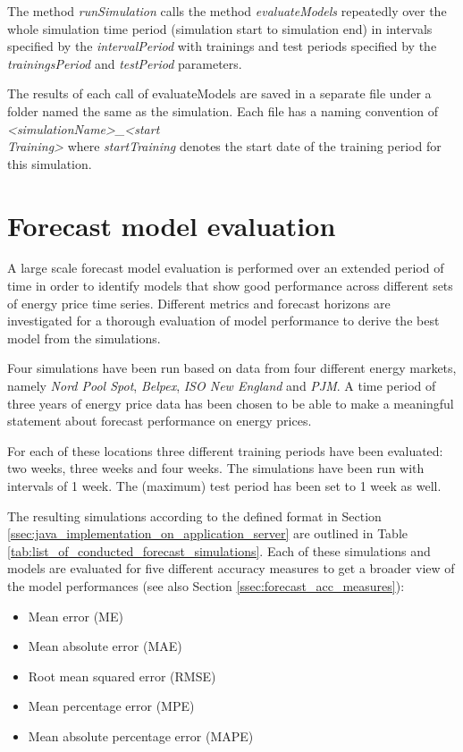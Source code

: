The method \textit{runSimulation} calls the method \textit{evaluateModels} repeatedly over the whole simulation time period (simulation start to simulation end) in intervals specified by the \textit{intervalPeriod} with trainings and test periods specified by the \textit{trainingsPeriod} and \textit{testPeriod} parameters. 

The results of each call of evaluateModels are saved in a separate file under a folder named the same as the simulation. Each file has a naming convention of \textit{<simulationName>\_<start\\Training>} where \textit{startTraining} denotes the start date of the training period for this simulation. 



\section{Forecast model evaluation} \label{sec:forecast_model_evaluation}

A large scale forecast model evaluation is performed over an extended period of time in order to identify models that show good performance across different sets of energy price time series. Different metrics and forecast horizons are investigated for a thorough evaluation of model performance to derive the best model from the simulations. 

Four simulations have been run based on data from four different energy markets, namely \textit{Nord Pool Spot}, \textit{Belpex}, \textit{ISO New England} and \textit{PJM}. A time period of three years of energy price data has been chosen to be able to make a meaningful statement about forecast performance on energy prices. 

For each of these locations three different training periods have been evaluated: two weeks, three weeks and four weeks. The simulations have been run with intervals of 1 week. The (maximum) test period has been set to 1 week as well. 

The resulting simulations according to the defined format in Section \ref{ssec:java_implementation_on_application_server} are outlined in Table \ref{tab:list_of_conducted_forecast_simulations}. Each of these simulations and models are evaluated for five different accuracy measures to get a broader view of the model performances (see also Section \ref{ssec:forecast_acc_measures}): 

\begin{itemize}
	\item Mean error (ME)
	\item Mean absolute error (MAE)
	\item Root mean squared error (RMSE)
	\item Mean percentage error (MPE)
	\item Mean absolute percentage error (MAPE)
\end{itemize}

